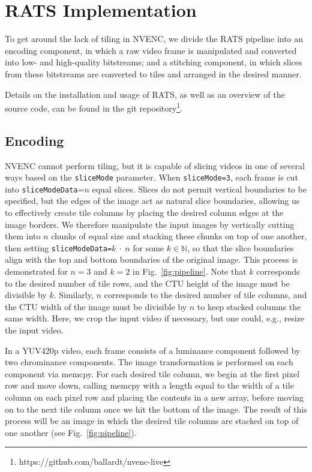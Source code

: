 \section{RATS Implementation} \label{rats}
To get around the lack of tiling in NVENC, we divide the RATS pipeline into an encoding component, in which a raw video frame is manipulated and converted into low- and high-quality bitstreams; and a stitching component, in which slices from these bitstreams are converted to tiles and arranged in the desired manner.

Details on the installation and usage of RATS, as well as an overview of the source code, can be found in the git repository\footnote{https://github.com/ballardt/nvenc-live}.

\subsection{Encoding}

NVENC cannot perform tiling, but it is capable of slicing videos in one of several ways based on the \texttt{sliceMode} parameter. When \texttt{sliceMode=3}, each frame is cut into \texttt{sliceModeData}=$n$ equal slices. Slices do not permit vertical boundaries to be specified, but the edges of the image act as natural slice boundaries, allowing us to effectively create tile columns by placing the desired column edges at the image borders. We therefore manipulate the input images by vertically cutting them into $n$ chunks of equal size and stacking these chunks on top of one another, then setting \texttt{sliceModeData=}$k~\cdot~n$ for some $k \in \mathbb{N}$, so that the slice boundaries align with the top and bottom boundaries of the original image. This process is demonstrated for $n=3$ and $k=2$ in Fig.~\ref{fig:pipeline}. Note that $k$ corresponds to the desired number of tile rows, and the CTU height of the image must be divisible by $k$. Similarly, $n$ corresponds to the desired number of tile columns, and the CTU width of the image must be divisible by $n$ to keep stacked columns the same width. Here, we crop the input video if necessary, but one could, e.g., resize the input video.

In a YUV420p video, each frame consists of a luminance component followed by two chrominance components. The image transformation is performed on each component via memcpy. For each desired tile column, we begin at the first pixel row and move down, calling memcpy with a length equal to the width of a tile column on each pixel row and placing the contents in a new array, before moving on to the next tile column once we hit the bottom of the image. The result of this process will be an image in which the desired tile columns are stacked on top of one another (see Fig.~\ref{fig:pipeline}).

